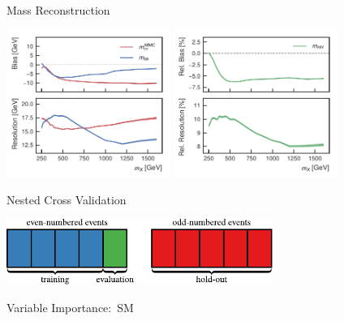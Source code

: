 \documentclass[11pt, xcolor={dvipsnames}, aspectratio=169, notes]{beamer}
\begin{document}

\begin{frame}{Mass Reconstruction}
  \centering

  \includegraphics[width=0.4\textwidth]{mva/mass_resolution}%
  \includegraphics[width=0.4\textwidth]{mva/mhh_resolution}
\end{frame}


\begin{frame}{Nested Cross Validation}
  \centering

  \includegraphics[width=0.65\textwidth]{mva/kfold}
\end{frame}


\begin{frame}{Variable Importance:\ SM~\allbold{\HH}}
  \centering\footnotesize

  
\end{frame}

\end{document}
